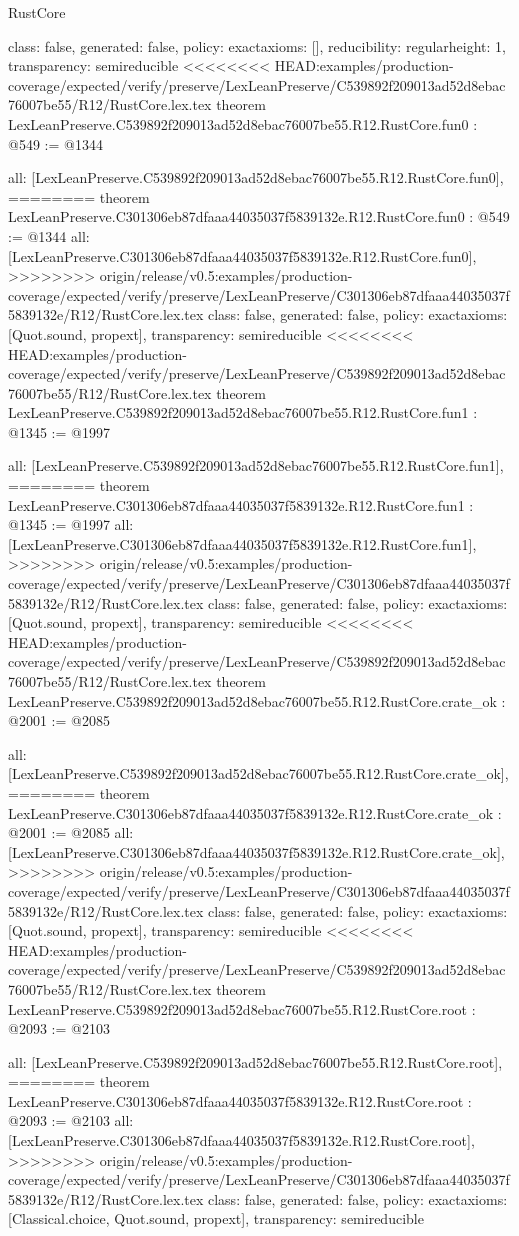 \begin{lexlean}{RustCore}
\begin{coremodule}
{\begin{coremodule}
{{{  class: false,
  generated: false,
  policy: exact{axioms: []},
  reducibility: regular{height: 1},
  transparency: semireducible
}
<<<<<<<< HEAD:examples/production-coverage/expected/verify/preserve/LexLeanPreserve/C539892f209013ad52d8ebac76007be55/R12/RustCore.lex.tex
theorem LexLeanPreserve.C539892f209013ad52d8ebac76007be55.R12.RustCore.fun0 : @549 := @1344 {
  all: [LexLeanPreserve.C539892f209013ad52d8ebac76007be55.R12.RustCore.fun0],
========
theorem LexLeanPreserve.C301306eb87dfaaa44035037f5839132e.R12.RustCore.fun0 : @549 := @1344 {
  all: [LexLeanPreserve.C301306eb87dfaaa44035037f5839132e.R12.RustCore.fun0],
>>>>>>>> origin/release/v0.5:examples/production-coverage/expected/verify/preserve/LexLeanPreserve/C301306eb87dfaaa44035037f5839132e/R12/RustCore.lex.tex
  class: false,
  generated: false,
  policy: exact{axioms: [Quot.sound, propext]},
  transparency: semireducible
}
<<<<<<<< HEAD:examples/production-coverage/expected/verify/preserve/LexLeanPreserve/C539892f209013ad52d8ebac76007be55/R12/RustCore.lex.tex
theorem LexLeanPreserve.C539892f209013ad52d8ebac76007be55.R12.RustCore.fun1 : @1345 := @1997 {
  all: [LexLeanPreserve.C539892f209013ad52d8ebac76007be55.R12.RustCore.fun1],
========
theorem LexLeanPreserve.C301306eb87dfaaa44035037f5839132e.R12.RustCore.fun1 : @1345 := @1997 {
  all: [LexLeanPreserve.C301306eb87dfaaa44035037f5839132e.R12.RustCore.fun1],
>>>>>>>> origin/release/v0.5:examples/production-coverage/expected/verify/preserve/LexLeanPreserve/C301306eb87dfaaa44035037f5839132e/R12/RustCore.lex.tex
  class: false,
  generated: false,
  policy: exact{axioms: [Quot.sound, propext]},
  transparency: semireducible
}
<<<<<<<< HEAD:examples/production-coverage/expected/verify/preserve/LexLeanPreserve/C539892f209013ad52d8ebac76007be55/R12/RustCore.lex.tex
theorem LexLeanPreserve.C539892f209013ad52d8ebac76007be55.R12.RustCore.crate_ok : @2001 := @2085 {
  all: [LexLeanPreserve.C539892f209013ad52d8ebac76007be55.R12.RustCore.crate_ok],
========
theorem LexLeanPreserve.C301306eb87dfaaa44035037f5839132e.R12.RustCore.crate_ok : @2001 := @2085 {
  all: [LexLeanPreserve.C301306eb87dfaaa44035037f5839132e.R12.RustCore.crate_ok],
>>>>>>>> origin/release/v0.5:examples/production-coverage/expected/verify/preserve/LexLeanPreserve/C301306eb87dfaaa44035037f5839132e/R12/RustCore.lex.tex
  class: false,
  generated: false,
  policy: exact{axioms: [Quot.sound, propext]},
  transparency: semireducible
}
<<<<<<<< HEAD:examples/production-coverage/expected/verify/preserve/LexLeanPreserve/C539892f209013ad52d8ebac76007be55/R12/RustCore.lex.tex
theorem LexLeanPreserve.C539892f209013ad52d8ebac76007be55.R12.RustCore.root : @2093 := @2103 {
  all: [LexLeanPreserve.C539892f209013ad52d8ebac76007be55.R12.RustCore.root],
========
theorem LexLeanPreserve.C301306eb87dfaaa44035037f5839132e.R12.RustCore.root : @2093 := @2103 {
  all: [LexLeanPreserve.C301306eb87dfaaa44035037f5839132e.R12.RustCore.root],
>>>>>>>> origin/release/v0.5:examples/production-coverage/expected/verify/preserve/LexLeanPreserve/C301306eb87dfaaa44035037f5839132e/R12/RustCore.lex.tex
  class: false,
  generated: false,
  policy: exact{axioms: [Classical.choice, Quot.sound, propext]},
  transparency: semireducible
}

}}}}}}
\end{coremodule}}
\end{coremodule}
\end{lexlean}
